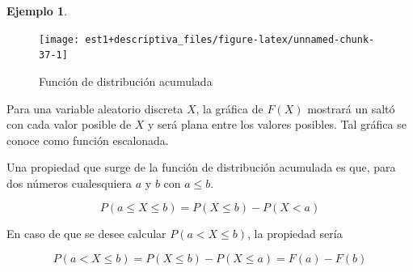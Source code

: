 \documentclass[
  11pt,
]{book}
\newenvironment{Shaded}{\begin{snugshade}}{\end{snugshade}}
\newcommand{\AttributeTok}[1]{\textcolor[rgb]{0.13,0.29,0.53}{#1}}
\newcommand{\CommentTok}[1]{\textcolor[rgb]{0.56,0.35,0.01}{\textit{#1}}}
\newcommand{\DecValTok}[1]{\textcolor[rgb]{0.00,0.00,0.81}{#1}}
\newcommand{\FloatTok}[1]{\textcolor[rgb]{0.00,0.00,0.81}{#1}}
\newcommand{\FunctionTok}[1]{\textcolor[rgb]{0.13,0.29,0.53}{\textbf{#1}}}
\newcommand{\NormalTok}[1]{#1}
\newcommand{\SpecialCharTok}[1]{\textcolor[rgb]{0.81,0.36,0.00}{\textbf{#1}}}
\newcommand{\StringTok}[1]{\textcolor[rgb]{0.31,0.60,0.02}{#1}}
\theoremstyle{definition}
\theoremstyle{definition}
\newtheorem{example}{Ejemplo}[chapter]
\theoremstyle{definition}
\theoremstyle{definition}
\theoremstyle{remark}
\begin{document}
\begin{example}
\begin{Shaded}
\end{Shaded}

\begin{figure}

{\centering \texttt{[image: est1+descriptiva\_files/figure-latex/unnamed-chunk-37-1]} 

}

\caption{Función de distribución acumulada}\label{fig:unnamed-chunk-37}
\end{figure}

Para una variable aleatorio discreta \(X\), la gráfica de \(F(X)\) mostrará un saltó con cada valor posible de \(X\) y será plana entre los valores posibles. Tal gráfica se conoce como función escalonada.
\end{example}

Una propiedad que surge de la función de distribución acumulada es que, para dos números cualesquiera \(a\) y \(b\) con \(a\leq b\).

\begin{equation}
P(a\leq X \leq b) = P(X \leq b) - P(X < a)
\label{eq:fda2}
\end{equation}

En caso de que se desee calcular \(P(a < X \leq b)\), la propiedad sería

\begin{equation}
P(a < X \leq b) = P(X \leq b) - P(X \leq a) = F(a) - F(b)
\label{eq:fda3}
\end{equation}
\end{document}
